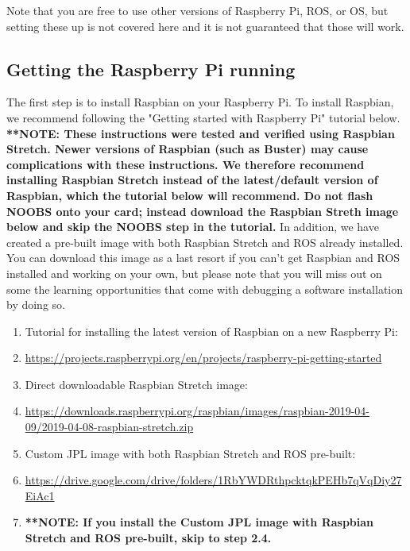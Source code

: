 \documentclass{article}
\begin{document}
Note that you are free to use other versions of Raspberry Pi, ROS, or OS, but setting these up is not covered here
and it is not guaranteed that those will work.

\subsection{Getting the Raspberry Pi running}
The first step is to install Raspbian on your Raspberry Pi. To install Raspbian,
we recommend following the "Getting started with Raspberry Pi" tutorial below.  \textbf{**NOTE: These instructions were tested and verified using Raspbian Stretch.  Newer versions of Raspbian (such as Buster) may cause complications with these instructions.  We therefore recommend installing Raspbian Stretch instead of the latest/default version of Raspbian, which the tutorial below will recommend.  Do not flash NOOBS onto your card; instead download the Raspbian Streth image below and skip the NOOBS step in the tutorial.}  In addition, we have created a pre-built image with both Raspbian Stretch and ROS already installed.  You can download this image as a last resort if you can't get Raspbian and ROS installed and working on your own, but please note that you will miss out on some the learning opportunities that come with debugging a software installation by doing so.

\begin{enumerate}
	\item[] Tutorial for installing the latest version of Raspbian on a new Raspberry Pi:
	\item[] \href{https://projects.raspberrypi.org/en/projects/raspberry-pi-getting-started}{https://projects.raspberrypi.org/en/projects/raspberry-pi-getting-started}
	\item[] Direct downloadable Raspbian Stretch image:
	\item[] \href{https://downloads.raspberrypi.org/raspbian/images/raspbian-2019-04-09/2019-04-08-raspbian-stretch.zip}{https://downloads.raspberrypi.org/raspbian/images/raspbian-2019-04-09/2019-04-08-raspbian-stretch.zip}
	\item[] Custom JPL image with both Raspbian Stretch and ROS pre-built:
	\item[] \href{https://drive.google.com/drive/folders/1RbYWDRthpcktqkPEHb7qVqDiy27EiAc1}{https://drive.google.com/drive/folders/1RbYWDRthpcktqkPEHb7qVqDiy27EiAc1}
	\item[] \textbf{**NOTE: If you install the Custom JPL image with Raspbian Stretch and ROS pre-built, skip to step 2.4.}
\end{enumerate}
\end{document}
